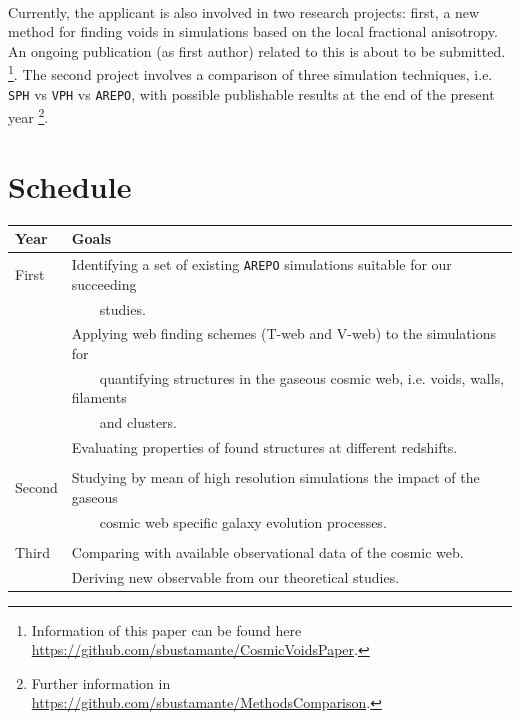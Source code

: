 \documentclass[a4,useAMS,usenatbib,usegraphicx,12pt]{article}
\begin{document}
\

Currently, the applicant is also involved in two research projects: first, a 
new method for finding voids in simulations based on the local fractional 
anisotropy. An ongoing publication (as first author) related to this is about 
to be submitted. \footnote{\scriptsize Information of this paper can be found 
here \url{https://github.com/sbustamante/CosmicVoidsPaper}.}. The second project
involves a comparison of three simulation techniques, i.e. \texttt{SPH} vs 
\texttt{VPH} vs \texttt{AREPO}, with possible publishable results at the end of
the present year \footnote{\scriptsize Further information in  
\url{https://github.com/sbustamante/MethodsComparison}.}.


\section{Schedule}

\begin{table}[h]
\begin{flushleft}
\begin{center}
  \begin{tabular}{l  l} \hline\hline
	\centering\textbf{Year} & \textbf{Goals} \\ \hline
	First  
	& \tabitem Identifying a set of existing \texttt{AREPO} simulations suitable 
	for our succeeding \\
	& \ \ \ \ studies. \\
	& \tabitem Applying web finding schemes (T-web and V-web) to the simulations 
	for\\
	& \ \ \ \ quantifying structures in the gaseous cosmic web, i.e. voids, walls, 
	filaments\\
	& \ \ \ \ and clusters.\\
	& \tabitem Evaluating properties of found structures at different redshifts.\\
	\\
	Second
	& \tabitem Studying by mean of high resolution simulations the impact of the 
	gaseous\\
	& \ \ \ \ cosmic web specific galaxy evolution processes.\\
	\\	
	Third
	& \tabitem Comparing with available observational data of the cosmic web.\\
	& \tabitem Deriving new observable from our theoretical studies.\\ 
	
	\hline\hline
  \end{tabular}  
\end{center}
\end{flushleft}
\end{table}



\renewcommand{\bibname}{8\ \ \ \ Bibliography}
\small

\end{document}
